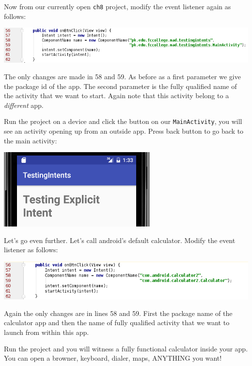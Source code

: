 Now from our currently open \texttt{ch8} project, modify the event listener again as follows:

\begin{center}
	\includegraphics[scale=0.4]{chapters/ch09/images/18}
\end{center}

The only changes are made in 58 and 59. As before as a first parameter we give the package id of the app. The second parameter is the fully qualified name of the activity that we want to start. Again note that this activity belong to a \textit{different} app.

Run the project on a device and click the button on our \texttt{MainActivity}, you will see an activity opening up from an outside app. Press back button to go back to the main activity:

\begin{center}
	\includegraphics[scale=0.4]{chapters/ch09/images/21}
\end{center}

Let's go even further. Let's call android's default calculator. Modify the event listener as follows:

\begin{center}
	\includegraphics[scale=0.4]{chapters/ch09/images/19}
\end{center}

Again the only changes are in lines 58 and 59. First the package name of the calculator app and then the name of fully qualified activity that we want to launch from within this app. 

Run the project and you will witness a fully functional calculator inside your app. You can open a browner, keyboard, dialer, maps, ANYTHING you want! \\

